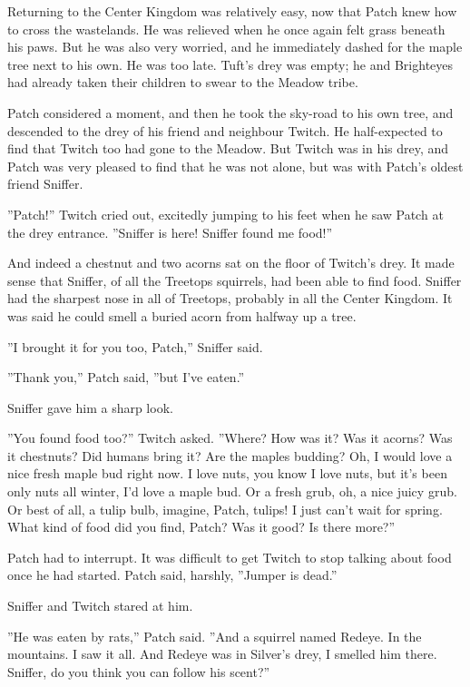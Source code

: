 \documentclass[12pt]{book}
\begin{document}
 Returning to the Center Kingdom was relatively easy, now that Patch knew how to cross the wastelands. He was relieved when he once again felt grass beneath his paws. But he was also very worried, and he immediately dashed for the maple tree next to his own. He was too late. Tuft's drey was empty; he and Brighteyes had already taken their children to swear to the Meadow tribe.\par
Patch considered a moment, and then he took the sky-road to his own tree, and descended to the drey of his friend and neighbour Twitch. He half-expected to find that Twitch too had gone to the Meadow. But Twitch was in his drey, and Patch was very pleased to find that he was not alone, but was with Patch's oldest friend Sniffer.\par
''Patch!'' Twitch cried out, excitedly jumping to his feet when he saw Patch at the drey entrance. ''Sniffer is here! Sniffer found me food!''\par
And indeed a chestnut and two acorns sat on the floor of Twitch's drey. It made sense that Sniffer, of all the Treetops squirrels, had been able to find food. Sniffer had the sharpest nose in all of Treetops, probably in all the Center Kingdom. It was said he could smell a buried acorn from halfway up a tree.\par
''I brought it for you too, Patch,'' Sniffer said.\par
''Thank you,'' Patch said, ''but I've eaten.''\par
Sniffer gave him a sharp look.\par
''You found food too?'' Twitch asked. ''Where? How was it? Was it acorns? Was it chestnuts? Did humans bring it? Are the maples budding? Oh, I would love a nice fresh maple bud right now. I love nuts, you know I love nuts, but it's been only nuts all winter, I'd love a maple bud. Or a fresh grub, oh, a nice juicy grub. Or best of all, a tulip bulb, imagine, Patch, tulips! I just can't wait for spring. What kind of food did you find, Patch? Was it good? Is there more?''\par
Patch had to interrupt. It was difficult to get Twitch to stop talking about food once he had started. Patch said, harshly, ''Jumper is dead.''\par
Sniffer and Twitch stared at him.\par
''He was eaten by rats,'' Patch said. ''And a squirrel named Redeye. In the mountains. I saw it all. And Redeye was in Silver's drey, I smelled him there. Sniffer, do you think you can follow his scent?''\par
\end{document}
